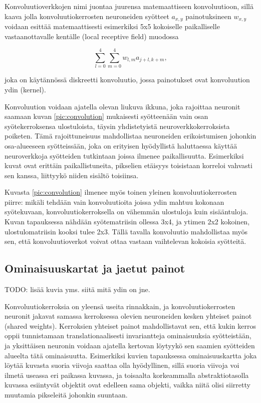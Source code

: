 \documentclass[finnish]{tktltiki2}
\theoremstyle{definition}
\theoremstyle{remark}
\begin{document}
    Konvoluutioverkkojen nimi juontaa juurensa matemaattiseen konvoluutioon, sillä kaava jolla konvoluutiokerrosten neuroneiden syötteet $a_{x,y}$ painotuksineen $w_{x,y}$ voidaan esittää matemaattisesti esimerkiksi 5x5 kokoiselle paikalliselle vastaanottavalle kentälle (local receptive field) muodossa

    $$ \sum_{l=0}^{4}\sum_{m=0}^{4} w_{l,m}a_{j+l,k+m},$$
    
    joka on käytännössä diskreetti konvoluutio, jossa painotukset ovat konvoluution ydin (kernel).

    Konvoluution voidaan ajatella olevan liukuva ikkuna, joka rajoittaa neuronit saamaan kuvan \ref{pic:convolution} mukaisesti syötteenään vain osan syötekerroksensa ulostuloista, täysin yhdistetyistä neuroverkkokerroksista poiketen. Tämä rajoittuneisuus mahdollistaa neuroneiden erikoistumisen johonkin osa-alueeseen syötteissään, joka on erityisen hyödyllistä haluttaessa käyttää neuroverkkoja syötteiden tutkintaan joissa ilmenee paikallisuutta. Esimerkiksi kuvat ovat erittäin paikallistuneita, pikselien etäisyys toisistaan korreloi vahvasti sen kanssa, liittyykö niiden sisältö toisiinsa.

    Kuvasta \ref{pic:convolution} ilmenee myös toinen yleinen konvoluutiokerrosten piirre: mikäli tehdään vain konvoluutioita joissa ydin mahtuu kokonaan syötekuvaan, konvoluutiokerroksella on vähemmän ulostuloja kuin sisääntuloja. Kuvan tapauksessa nähdään syötematriisin ollessa 3x4, ja ytimen 2x2 kokoinen, ulostulomatriisin kooksi tulee 2x3. Tällä tavalla konvoluutio mahdollistaa myös sen, että konvoluutioverkot voivat ottaa vastaan vaihtelevan kokoisia syötteitä.

    \subsection{Ominaisuuskartat ja jaetut painot}
  TODO: lisää kuvia yms. siitä mitä ydin on jne.

    Konvoluutiokerroksia on yleensä useita rinnakkain, ja konvoluutiokerrosten neuronit jakavat samassa kerroksessa olevien neuroneiden kesken yhteiset painot (shared weights). Kerroksien yhteiset painot mahdollistavat sen, että kukin kerros oppii tunnistamaan translationaalisesti invariantteja ominaisuuksia syötteistään, ja yksittäisen neuronin voidaan ajatella kertovan löytyykö sen saamien syötteiden alueelta tätä ominaisuutta. Esimerkiksi kuvien tapauksessa ominaisuuskartta joka löytää kuvasta suoria viivoja saattaa olla hyödyllinen, sillä suoria viivoja voi ilmetä useassa eri paikassa kuvassa, ja toisaalta korkeammalla abstraktiotasolla kuvassa esiintyvät objektit ovat edelleen sama objekti, vaikka niitä olisi siirretty muutamia pikseleitä johonkin suuntaan.
\end{document}

